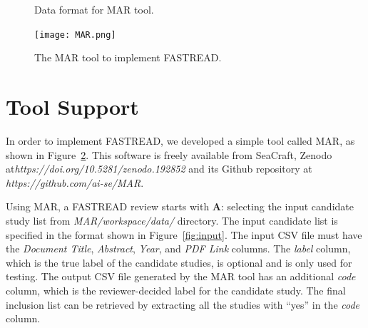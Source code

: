 \documentclass[final,twocolumn,5p]{elsarticle}
\theoremstyle{break}
\begin{document}
\begin{figure}[!t]
    \centering
    
    \caption{Data format for MAR tool.}
    \label{fig:csv}
\end{figure}
\begin{figure}[!t]
    \centering
    \texttt{[image: MAR.png]}
    \caption{The MAR tool to implement FASTREAD.}
    \label{fig:MAR}
\end{figure}

\section{Tool Support}
\label{sect: tool}

In order to implement FASTREAD, we developed a simple tool called MAR, as shown in Figure~\ref{fig:MAR}. This software is freely available
from SeaCraft, Zenodo at\textit{https://doi.org/10.5281/zenodo.192852} and its Github repository at \textit{https://github.com/ai-se/MAR}. 


Using MAR, a FASTREAD review starts with \textbf{A}: selecting the input candidate study list from \textit{MAR/workspace/data/} directory. The input candidate list is specified in the format shown in Figure~\ref{fig:input}. The input CSV file must have the \textit{Document Title}, \textit{Abstract}, \textit{Year}, and \textit{PDF Link} columns. The \textit{label} column, which is the true label of the candidate studies, is optional and is only used for testing. The output CSV file generated by the MAR tool has an additional \textit{code} column, which is the reviewer-decided label for the candidate study. The final inclusion list can be retrieved by extracting all the studies with ``yes'' in the \textit{code} column.
\end{document}
